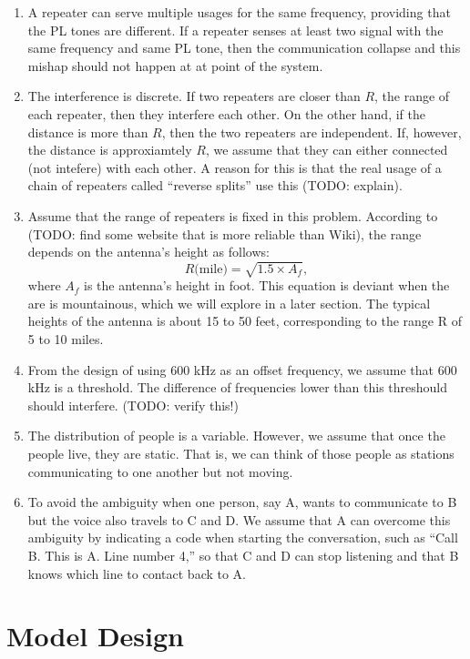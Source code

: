 \documentclass{icmmcm}
\begin{document}
\begin{enumerate}
\item A repeater can serve multiple usages for the same frequency, providing that the PL tones are different. If a repeater senses at least two signal with the same frequency and same PL tone, then the communication collapse and this mishap should not happen at at point of the system.
\item The interference is discrete. If two repeaters are closer than $R$, the range of each repeater, then they interfere each other. On the other hand, if the distance is more than $R$, then the two repeaters are independent. If, however, the distance is approxiamtely $R$, we assume that they can either connected (not intefere) with each other. A reason for this is that the real usage of a chain of repeaters called ``reverse splits'' use this (TODO: explain).  

\item Assume that the range of repeaters is fixed in this problem. According to (TODO: find some website that is more reliable than Wiki), the range depends on the antenna's height as follows:
$$R\text{(mile)}=\sqrt{1.5\times A_f},$$
where $A_f$ is the antenna's height in foot. This equation is deviant when the are is mountainous, which we will explore in a later section. The typical heights of the antenna is about 15 to 50 feet, corresponding to the range R of 5 to 10 miles.  
\item From the design of using 600 kHz as an offset frequency, we assume that 600 kHz is a threshold. The difference of frequencies lower than this threshould should interfere. (TODO: verify this!)
\item The distribution of people is a variable. However, we assume that once the people live, they are static. That is, we can think of those people as stations communicating to one another but not moving.
\item To avoid the ambiguity when one person, say A, wants to communicate to B but the voice also travels to C and D. We assume that A can overcome this ambiguity by indicating a code when starting the conversation, such as ``Call B. This is A. Line number 4,''  so that C and D can stop listening and that B knows which line to contact back to A.
\end{enumerate}
\section{Model Design}
\end{document}
